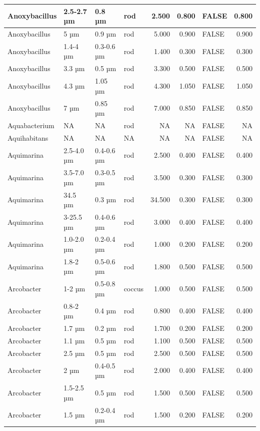 \documentclass[
]{article}
\begin{document}
\begin{table}
\begin{tabular}{l|l|l|l|r|r|l|r}
\hline
Anoxybacillus & 2.5-2.7 µm & 0.8 µm & rod & 2.500 & 0.800 & FALSE & 0.800\\
\hline
Anoxybacillus & 5 µm & 0.9 µm & rod & 5.000 & 0.900 & FALSE & 0.900\\
\hline
Anoxybacillus & 1.4-4 µm & 0.3-0.6 µm & rod & 1.400 & 0.300 & FALSE & 0.300\\
\hline
Anoxybacillus & 3.3 µm & 0.5 µm & rod & 3.300 & 0.500 & FALSE & 0.500\\
\hline
Anoxybacillus & 4.3 µm & 1.05 µm & rod & 4.300 & 1.050 & FALSE & 1.050\\
\hline
Anoxybacillus & 7 µm & 0.85 µm & rod & 7.000 & 0.850 & FALSE & 0.850\\
\hline
Aquabacterium & NA & NA & rod & NA & NA & FALSE & NA\\
\hline
Aquihabitans & NA & NA & NA & NA & NA & FALSE & NA\\
\hline
Aquimarina & 2.5-4.0 µm & 0.4-0.6 µm & rod & 2.500 & 0.400 & FALSE & 0.400\\
\hline
Aquimarina & 3.5-7.0 µm & 0.3-0.5 µm & rod & 3.500 & 0.300 & FALSE & 0.300\\
\hline
Aquimarina & 34.5 µm & 0.3 µm & rod & 34.500 & 0.300 & FALSE & 0.300\\
\hline
Aquimarina & 3-25.5 µm & 0.4-0.6 µm & rod & 3.000 & 0.400 & FALSE & 0.400\\
\hline
Aquimarina & 1.0-2.0 µm & 0.2-0.4 µm & rod & 1.000 & 0.200 & FALSE & 0.200\\
\hline
Aquimarina & 1.8-2 µm & 0.5-0.6 µm & rod & 1.800 & 0.500 & FALSE & 0.500\\
\hline
Arcobacter & 1-2 µm & 0.5-0.8 µm & coccus & 1.000 & 0.500 & FALSE & 0.500\\
\hline
Arcobacter & 0.8-2 µm & 0.4 µm & rod & 0.800 & 0.400 & FALSE & 0.400\\
\hline
Arcobacter & 1.7 µm & 0.2 µm & rod & 1.700 & 0.200 & FALSE & 0.200\\
\hline
Arcobacter & 1.1 µm & 0.5 µm & rod & 1.100 & 0.500 & FALSE & 0.500\\
\hline
Arcobacter & 2.5 µm & 0.5 µm & rod & 2.500 & 0.500 & FALSE & 0.500\\
\hline
Arcobacter & 2 µm & 0.4-0.5 µm & rod & 2.000 & 0.400 & FALSE & 0.400\\
\hline
Arcobacter & 1.5-2.5 µm & 0.5 µm & rod & 1.500 & 0.500 & FALSE & 0.500\\
\hline
Arcobacter & 1.5 µm & 0.2-0.4 µm & rod & 1.500 & 0.200 & FALSE & 0.200\\

\end{tabular}
\end{table}
\end{document}
